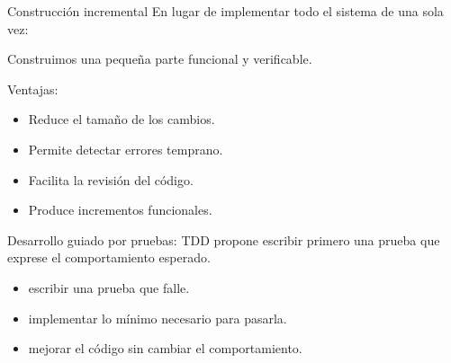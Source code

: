 \documentclass[11pt,aspectratio=169]{beamer}
\begin{document}
\begin{frame}{Construcción incremental}
En lugar de implementar todo el sistema de una sola vez:
\begin{statement}
  Construimos una pequeña parte funcional y verificable.
\end{statement}


Ventajas:
\begin{itemize}
  \item Reduce el tamaño de los cambios.
  \item Permite detectar errores temprano.
  \item Facilita la revisión del código.
  \item Produce incrementos funcionales.
\end{itemize}
\end{frame}

\begin{frame}{Desarrollo guiado por pruebas: TDD}
 propone escribir primero una prueba que
exprese el comportamiento esperado.

\begin{center}
\end{center}

\begin{itemize}
  \item {} escribir una prueba que falle.
  \item {} implementar lo mínimo necesario para pasarla.
  \item {} mejorar el código sin cambiar el comportamiento.
\end{itemize}
\end{frame}
\end{document}
